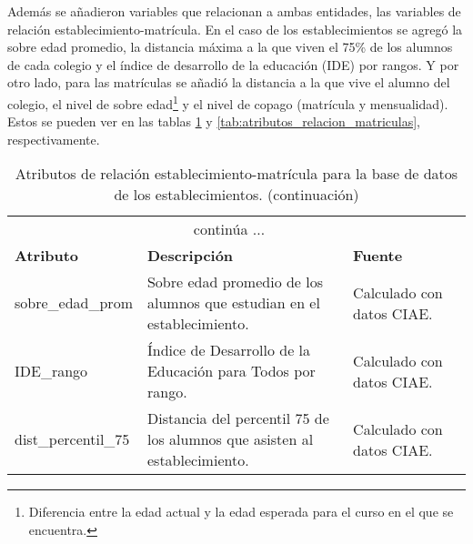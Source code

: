 \begin{itemize}
Además se añadieron variables que relacionan a ambas entidades, las variables de relación establecimiento-matrícula. En el caso de los establecimientos se agregó la sobre edad promedio, la distancia máxima a la que viven el 75\% de los alumnos de cada colegio y el índice de desarrollo de la educación (IDE) por rangos. Y por otro lado, para las matrículas se añadió la distancia a la que vive el alumno del colegio, el nivel de sobre edad\footnote{Diferencia entre la edad actual y la edad esperada para el curso en el que se encuentra.} y el nivel de copago (matrícula y mensualidad). Estos se pueden ver en las tablas \ref{tab:atributos_relacion_establecimientos} y \ref{tab:atributos_relacion_matriculas}, respectivamente.

\begin{footnotesize}
\begin{longtable}{|p{}|p{}|p{}|p{}|}
\caption{Atributos de relación establecimiento-matrícula para la base de datos de los establecimientos.}\label{tab:atributos_relacion_establecimientos}\\
\hline
\endfirsthead
\caption[]{Atributos de relación establecimiento-matrícula para la base de datos de los establecimientos. (continuación)}\\
\hline
\endhead
\hline
\multicolumn{3}{|c|}{continúa $\ldots$}\\
\hline
\endfoot
\hline
\endlastfoot
\textbf{Atributo}  & \textbf{Descripción} & \textbf{Fuente}\\ \hline
sobre\_edad\_prom & Sobre edad promedio de los alumnos que estudian en el establecimiento. & Calculado con datos CIAE. \\ \hline
IDE\_rango & Índice de Desarrollo de la Educación para Todos por rango. & Calculado con datos CIAE. \\ \hline
dist\_percentil\_75 & Distancia del percentil 75 de los alumnos que asisten al establecimiento. & Calculado con datos CIAE.\\ \hline
\end{longtable} 
\end{footnotesize}


\end{itemize}

